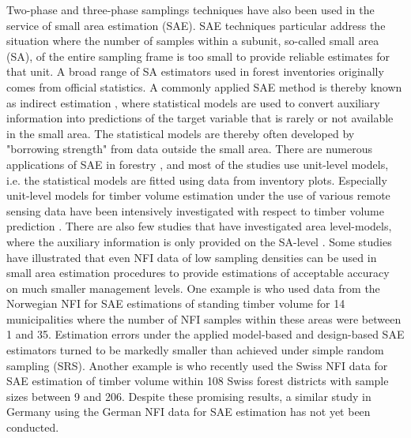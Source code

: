 Two-phase and three-phase samplings techniques have also been used in the service of small area estimation (SAE). SAE techniques particular address the situation where the number of samples within a subunit, so-called small area (SA), of the entire sampling frame is too small to provide reliable estimates for that unit. A broad range of SA estimators used in forest inventories \citep{kohl2006} originally comes from official statistics. A commonly applied SAE method is thereby known as indirect estimation \citep{rao2015}, where statistical models are used to convert auxiliary information into predictions of the target variable that is rarely or not available in the small area. The statistical models are thereby often developed by "borrowing strength" from data outside the small area. There are numerous applications of SAE in forestry \citep{breidenbach2012, goerndt2011, steinmann2013, mandallaz2013b}, and most of the studies use unit-level models, i.e. the statistical models are fitted using data from inventory plots. Especially unit-level models for timber volume estimation under the use of various remote sensing data have been intensively investigated with respect to timber volume prediction \citep{koch2010, naesset2014inmaltamo}. There are also few studies that have investigated area level-models, where the auxiliary information is only provided on the SA-level \citep{magnussen2017}. Some studies have illustrated that even NFI data of low sampling densities can be used in small area estimation procedures to provide estimations of acceptable accuracy on much smaller management levels. One example is \citet{breidenbach2012} who used data from the Norwegian NFI for SAE estimations of standing timber volume for 14 municipalities where the number of NFI samples within these areas were between 1 and 35. Estimation errors under the applied model-based and design-based SAE estimators turned to be markedly smaller than achieved under simple random sampling (SRS). Another example is \citet{magnussen2014} who recently used the Swiss NFI data for SAE estimation of timber volume within 108 Swiss forest districts with sample sizes between 9 and 206. Despite these promising results, a similar study in Germany using the German NFI data for SAE estimation has not yet been conducted.\par

